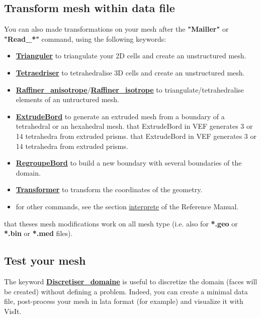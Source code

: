 \subsection{Transform mesh within data file}
You can also made transformations on your mesh after the \textbf{"Mailler"} or \textbf{"Read\_*"} command, using the following keywords:
\begin{itemize}
\item \href{TRUST_Reference_Manual.pdf\#triangulate}{\textbf{Trianguler}} to triangulate your 2D cells and create an unstructured mesh.
\item \href{TRUST_Reference_Manual.pdf\#tetraedriser}{\textbf{Tetraedriser}} to tetrahedralise 3D cells and create an unstructured mesh.
\item \href{TRUST_Reference_Manual.pdf\#raffineranisotrope}{\textbf{Raffiner\_anisotrope}}/\href{TRUST_Reference_Manual.pdf\#raffinerisotrope}{\textbf{Raffiner\_isotrope}} to triangulate/tetrahedralise elements of an untructured mesh.
\item \href{TRUST_Reference_Manual.pdf\#extrudebord}{\textbf{ExtrudeBord}} to generate an extruded mesh from a boundary of a tetrahedral or an hexahedral mesh. \Note that ExtrudeBord in VEF generates 3 or 14 tetrahedra from extruded prisms.
\Note that ExtrudeBord in VEF generates 3 or 14 tetrahedra from extruded prisms.
\item \href{TRUST_Reference_Manual.pdf\#regroupebord}{\textbf{RegroupeBord}} to build a new boundary with several boundaries of the domain.
\item \href{TRUST_Reference_Manual.pdf\#transformer}{\textbf{Transformer}} to transform the coordinates of the geometry.
\item for other commands, see the section \href{TRUST_Reference_Manual.pdf\#interprete}{interprete} of the \trust Reference Manual.
\end{itemize}

\Note that theses mesh modifications work on all mesh type (i.e. also for \textbf{*.geo} or \textbf{*.bin} or \textbf{*.med} files).



\subsection{Test your mesh}
The keyword \href{TRUST_Reference_Manual.pdf\#discretiserdomaine}{\textbf{Discretiser\_domaine}} is useful to discretize the domain (faces will be created) without defining a problem.
Indeed, you can create a minimal data file, post-process your mesh in lata format (for example) and visualize it with VisIt. \\

